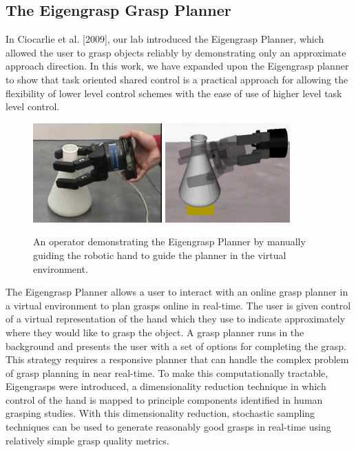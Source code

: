 \subsection{The Eigengrasp Grasp Planner}
 In Ciocarlie et al. [2009], our lab introduced the Eigengrasp Planner, which allowed the user to grasp objects reliably by demonstrating only an approximate approach direction. In this work, we have expanded upon the Eigengrasp planner to show that task oriented shared control is a practical approach for allowing the flexibility of lower level control schemes with the ease of use of higher level task level control. 

\begin{figure}[b]
	\includegraphics[height=1.5in,width=.495\columnwidth]{images_2/real_eg_grasp.png}
	\includegraphics[height=1.5in,width=.495\columnwidth]{images_2/simulated_eg_grasp2.png}
	\caption{An operator demonstrating the Eigengrasp Planner by manually guiding the robotic hand to guide the planner in the virtual environment.\cite{CiocarlieIJRR}}
	\label{fig:egplanner_demo} 
\end{figure}

The Eigengrasp Planner allows a user to interact with an online grasp planner in a virtual environment to plan grasps online in real-time. The user is given control of a virtual representation of the hand which they use to indicate approximately where they would like to grasp the object. A grasp planner runs in the background and presents the user with a set of options for completing the grasp. 
This strategy requires a responsive planner that can handle the complex problem of grasp planning in near real-time. To make this computationally tractable, Eigengrasps were introduced, a dimensionality reduction technique in which control of the hand is mapped to principle components identified in human grasping studies. With this dimensionality reduction, stochastic sampling techniques can be used to generate reasonably good grasps in real-time using relatively simple grasp quality metrics.
 
